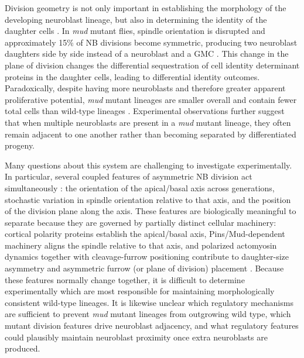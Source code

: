 Division geometry is not only important in establishing the morphology of the developing neuroblast lineage, but also in determining the identity of the daughter cells \cite{cabernard_2009_apicalbasalspindlea}.
In \textit{mud} mutant flies, spindle orientation is disrupted and approximately 15\% of NB divisions become symmetric, producing two neuroblast daughters side by side instead of a neuroblast and a GMC \cite{sillerNuMArelatedMudProtein2006, cabernard_2009_apicalbasalspindlea}.
This change in the plane of division changes the differential sequestration of cell identity determinant proteins in the daughter cells, leading to differential identity outcomes\cite{cabernard_2009_apicalbasalspindlea}.
Paradoxically, despite having more neuroblasts and therefore greater apparent proliferative potential, \textit{mud} mutant lineages are smaller overall and contain fewer total cells than wild-type lineages \cite{delgado_2025_alteringcellsize}.
Experimental observations further suggest that when multiple neuroblasts are present in a \textit{mud} mutant lineage, they often remain adjacent to one another rather than becoming separated by differentiated progeny.

Many questions about this system are challenging to investigate experimentally.
In particular, several coupled features of asymmetric NB division act simultaneously \invivo: the orientation of the apical/basal axis across generations, stochastic variation in spindle orientation relative to that axis, and the position of the division plane along the axis.
These features are biologically meaningful to separate because they are governed by partially distinct cellular machinery: cortical polarity proteins establish the apical/basal axis, Pins/Mud-dependent machinery aligns the spindle relative to that axis, and polarized actomyosin dynamics together with cleavage-furrow positioning contribute to daughter-size asymmetry and asymmetric furrow (or plane of division) placement \cite{prehodaPolarizationDrosophilaNeuroblasts2009, penkert_2024_drosophilaneuroblastpolarity, sillerNuMArelatedMudProtein2006, cabernard_2010_spindleindependentcleavagefurrow, connell_2011_asymmetriccorticalextension, tsankovaCellPolarityRegulates2017, roubinetSpatiotemporallySeparatedCortical2017a, pham_2019_spatiotemporallycontrolledmyosin}.
Because these features normally change together, it is difficult to determine experimentally which are most responsible for maintaining morphologically consistent wild-type lineages.
It is likewise unclear which regulatory mechanisms are sufficient to prevent \textit{mud} mutant lineages from outgrowing wild type, which mutant division features drive neuroblast adjacency, and what regulatory features could plausibly maintain neuroblast proximity once extra neuroblasts are produced.

